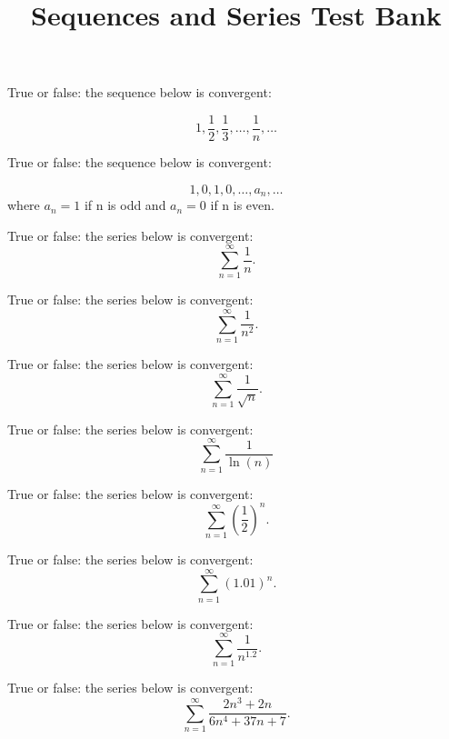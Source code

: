 \documentclass[10pt]{exam}
\title{Sequences and Series Test Bank}
\date{}
\begin{document}
\maketitle

\begin{questions}

\question  True or false: the sequence below is convergent:

$$1, \frac{1}{2}, \frac{1}{3}, \ldots, \frac{1}{n}, \ldots$$

\question True or false: the sequence below is convergent:

$$1, 0, 1, 0, \ldots, a_n, \ldots $$
where $a_n=1$ if n is odd and $a_n=0$ if n is even.  

\question True or false: the series below is convergent:
$$\sum_{n = 1}^\infty \frac{1}{n}.$$


\question True or false: the series below is convergent:
$$\sum_{n = 1}^\infty \frac{1}{n^2}.$$


\question True or false: the series below is convergent:
$$\sum_{n = 1}^\infty \frac{1}{\sqrt{n}}.$$

\question True or false: the series below is convergent:
$$\sum_{n = 1}^\infty \frac{1}{\ln(n)}$$

\question True or false: the series below is convergent:
$$\sum_{n = 1}^\infty \left(\frac{1}{2}\right)^n.$$

\question True or false: the series below is convergent:
$$\sum_{n = 1}^\infty (1.01)^n.$$

\question True or false: the series below is convergent:
$$\sum_{n = 1}^\infty \frac{1}{n^{1.2}}.$$


\question True or false: the series below is convergent:
$$\sum_{n = 1}^\infty \frac{2n^3+2n}{6n^4+37n+7}.$$


\end{questions}
\end{document}

